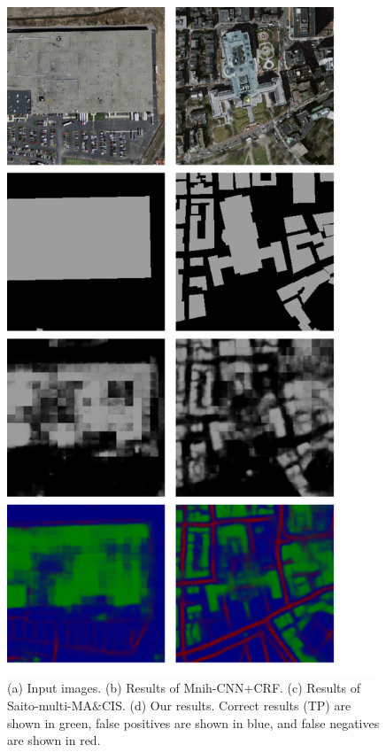 \documentclass[runningheads]{llncs}
\begin{document}
\begin{figure}
\centering
\includegraphics[width=110mm]{ComparedResults}
\caption{(a) Input images. (b) Results of Mnih-CNN+CRF\cite{Mnih2013Machine}. (c) Results of Saito-multi-MA$\&$CIS\cite{Saito2016Multiple}. (d) Our results. 
Correct results (TP) are shown in green, false positives are shown in blue, and false negatives are shown in red.}
\label{fig:ComparedResults}
\end{figure}

\end{document}
